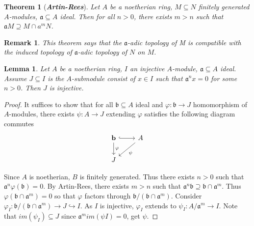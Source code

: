 \documentclass{ctexart}
\newtheorem{remark}{Remark}[section]
\newtheorem{theorem}{Theorem}[section]
\newtheorem{lemma}{Lemma}[section]
\begin{document}
\begin{theorem}[\textbf{\emph{Artin-Rees}}]
    Let $A$ be a noetherian ring, $M \subseteq N$ finitely generated $A$-modules, $\mathfrak{a} \subseteq A$ ideal.
    Then for all $n > 0$, there exists $m > n$ such that $\mathfrak{a}M \supseteq M \cap a^{m}N$.
    \vspace{-\baselineskip} %
    \label{Theorem 2.2}
\end{theorem}
\begin{remark}
    This theorem says that the $\mathfrak{a}$-adic topology of M is compatible with the induced topology of $\mathfrak{a}$-adic topology of $N$ on $M$. 
\end{remark}
\begin{lemma}
    Let $A$ be a noetherian ring, $I$ an injective $A$-module, $\mathfrak{a} \subseteq A$ ideal.
    Assume $J \subseteq I$ is the $A$-submodule consist of $x\in I$ such that $\mathfrak{a}^{n}x= 0$ for some $n > 0$.
    Then $J$ is injective.
    \label{Lemma 2.1}
\end{lemma}
\begin{proof}
    It suffices to show that for all $\mathfrak{b} \subseteq A$ ideal and $\varphi: \mathfrak{b} \longrightarrow J$ homomorphism of $A$-modules,
    there exists $\psi: A \longrightarrow J$ extending $\varphi$ satisfies the following diagram commutes
    \begin{equation}
        \begin{tikzcd}
            \mathbf{b} \arrow[r, hookrightarrow] \arrow[d, "\varphi"] &
            A \arrow[dl, "\psi"] \\
            J &
        \end{tikzcd}
    \end{equation}
    \par
    Since $A$ is noetherian, $B$ is finitely generated.
    Thus there exists $n > 0$ such that $\mathfrak{a}^{n}\varphi(\mathfrak{b}) = 0$.
    By Artin-Rees, there exists $m > n$ such that $\mathfrak{a}^{n}\mathfrak{b} \supseteq \mathfrak{b} \cap \mathfrak{a}^{m}$.
    Thus $\varphi(\mathfrak{b} \cap \mathfrak{a}^{m}) = 0$ so that $\varphi$ factors through $\mathfrak{b}/(\mathfrak{b} \cap \mathfrak{a}^{m})$.
    Consider $\varphi_{I}: \mathfrak{b}/(\mathfrak{b} \cap \mathfrak{a}^{m}) \longrightarrow J \hookrightarrow I$.
    As $I$ is injective, $\varphi_{I}$ extends to $\psi_{I}: A/\mathfrak{a}^{m} \longrightarrow I$.
    Note that $im(\psi_{I}) \subseteq J$ since $\mathfrak{a}^{m}im(\psi{I}) = 0$, get $\psi$. 
\end{proof}
\end{document}
